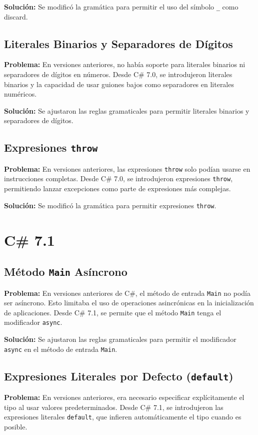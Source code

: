 \textbf{Solución:} Se modificó la gramática para permitir el uso del símbolo \texttt{\_} como discard.

\subsection{Literales Binarios y Separadores de Dígitos}
\textbf{Problema:} En versiones anteriores, no había soporte para literales binarios ni separadores de dígitos en números. Desde C\# 7.0, se introdujeron literales binarios y la capacidad de usar guiones bajos como separadores en literales numéricos.

\textbf{Solución:} Se ajustaron las reglas gramaticales para permitir literales binarios y separadores de dígitos.

\subsection{Expresiones \texttt{throw}}
\textbf{Problema:} En versiones anteriores, las expresiones \texttt{throw} solo podían usarse en instrucciones completas. Desde C\# 7.0, se introdujeron expresiones \texttt{throw}, permitiendo lanzar excepciones como parte de expresiones más complejas.

\textbf{Solución:} Se modificó la gramática para permitir expresiones \texttt{throw}.


\section{C\# 7.1}

\subsection{Método \texttt{Main} Asíncrono}
\textbf{Problema:} En versiones anteriores de C\#, el método de entrada \texttt{Main} no podía ser asíncrono. Esto limitaba el uso de operaciones asincrónicas en la inicialización de aplicaciones. Desde C\# 7.1, se permite que el método \texttt{Main} tenga el modificador \texttt{async}.


\textbf{Solución:} Se ajustaron las reglas gramaticales para permitir el modificador \texttt{async} en el método de entrada \texttt{Main}.

\subsection{Expresiones Literales por Defecto (\texttt{default})}
\textbf{Problema:} En versiones anteriores, era necesario especificar explícitamente el tipo al usar valores predeterminados. Desde C\# 7.1, se introdujeron las expresiones literales \texttt{default}, que infieren automáticamente el tipo cuando es posible.

